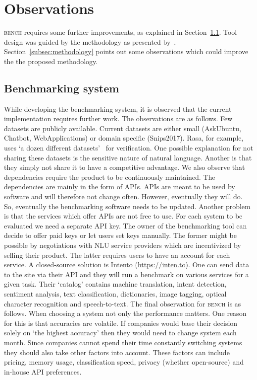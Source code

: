 \section{Observations}
\label{sec:observations}

\textsc{bench} requires some further improvements, as explained in Section~\ref{subsec:benchmarking_system}.
Tool design was guided by the methodology as presented by~\citet{braun2017}.
Section~\ref{subsec:methodology} points out some observations which could improve the the proposed methodology.

\subsection{Benchmarking system}
\label{subsec:benchmarking_system}
While developing the benchmarking system, it is observed that the current implementation requires further work.
The observations are as follows.
Few datasets are publicly available.
Current datasets are either small (AskUbuntu, Chatbot, WebApplications) or domain specific (Snips2017).
Rasa, for example, uses `a dozen different datasets'~\citep{nichol2018vectors} for verification.
One possible explanation for not sharing these datasets is the sensitive nature of natural language.
Another is that they simply not share it to have a competitive advantage.
We also observe that dependencies require the product to be continuously maintained.
The dependencies are mainly in the form of APIs.
APIs are meant to be used by software and will therefore not change often.
However, eventually they will do.
So, eventually the benchmarking software needs to be updated.
Another problem is that the services which offer APIs are not free to use.
For each system to be evaluated we need a separate API key.
The owner of the benchmarking tool can decide to offer paid keys or let users set keys manually.
The former might be possible by negotiations with NLU service providers which are incentivized by selling their product.
The latter requires users to have an account for each service.
A closed-source solution is Intento (\url{https://inten.to}).
One can send data to the site via their API and they will run a benchmark on various services for a given task.
Their `catalog' contains machine translation, intent detection, sentiment analysis, text classification, dictionaries, image tagging, optical character recognition and speech-to-text.
The final observation for \textsc{bench} is as follows.
When choosing a system not only the performance matters.
One reason for this is that accuracies are volatile.
If companies would base their decision solely on `the highest accuracy' then they would need to change system each month.
Since companies cannot spend their time constantly switching systems they should also take other factors into account.
These factors can include pricing, memory usage, classification speed, privacy (whether open-source) and in-house API preferences.

